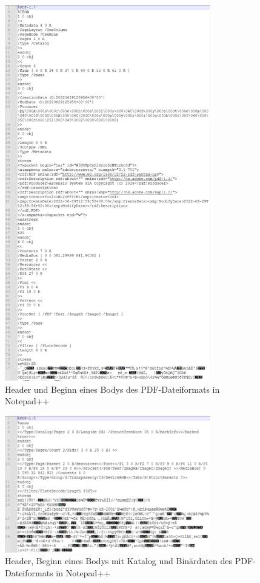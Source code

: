 \begin{figure}[!htb]
	\centering
	\includegraphics[width=0.8\textwidth]{"images/pdf_header2-notepad.png"}
	\caption{Header und Beginn eines Bodys des PDF-Dateiformats in Notepad++}
	\label{fig:header1}
\end{figure}

\begin{figure}[!htb]
	\centering
	\includegraphics[width=0.8\textwidth]{"images/pdf_header-notepad.png"}
	\caption{Header, Beginn eines Bodys mit Katalog und Binärdaten des PDF-Dateiformats in Notepad++}
	\label{fig:header2}
\end{figure}

